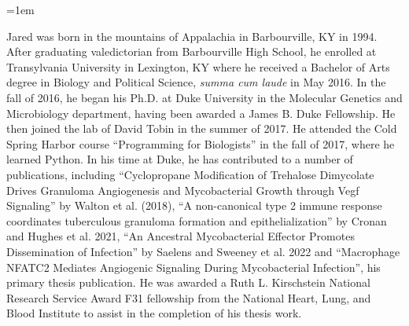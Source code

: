 \documentclass[PhD]{dukethesis2006}
\begin{document}
\begin{doublespace}

\end{doublespace}

% 

\emergencystretch=1em
\printbibliography[category=cited, heading=bibintoc]
\printbibliography[title={Cite Me Please},notcategory=cited]

	
\biography

\begin{doublespace}

Jared was born in the mountains of Appalachia in Barbourville, KY in 1994. After graduating valedictorian from Barbourville High School, he enrolled at Transylvania University in Lexington, KY where he received a Bachelor of Arts degree in Biology and Political Science, \textit{summa cum laude} in May 2016. In the fall of 2016, he began his Ph.D. at Duke University in the Molecular Genetics and Microbiology department, having been awarded a James B. Duke Fellowship. He then joined the lab of David Tobin in the summer of 2017. He attended the Cold Spring Harbor course ``Programming for Biologists'' in the fall of 2017, where he learned Python. In his time at Duke, he has contributed to a number of publications, including ``Cyclopropane Modification of Trehalose Dimycolate Drives Granuloma Angiogenesis and Mycobacterial Growth through Vegf Signaling'' by Walton et al. (2018), ``A non-canonical type 2 immune response coordinates tuberculous granuloma formation and epithelialization'' by Cronan and Hughes et al. 2021, ``An Ancestral Mycobacterial Effector Promotes Dissemination of Infection'' by Saelens and Sweeney et al. 2022 and ``Macrophage NFATC2 Mediates Angiogenic Signaling During Mycobacterial Infection'', his primary thesis publication. He was awarded a Ruth L. Kirschstein National Research Service Award F31 fellowship from the National Heart, Lung, and Blood Institute to assist in the completion of his thesis work.

\end{doublespace}
\end{document}
